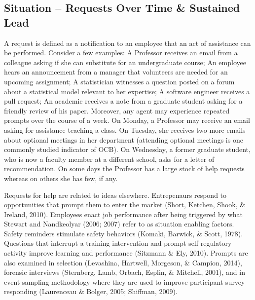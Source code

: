 \documentclass[english,,man]{apa6}
\begin{document}
\hypertarget{situation-requests-over-time-sustained-lead}{%
\subsection{Situation -- Requests Over Time \& Sustained Lead}\label{situation-requests-over-time-sustained-lead}}

A request is defined as a notification to an employee that an act of assistance can be performed. Consider a few examples: A Professor receives an email from a colleague asking if she can substitute for an undergraduate course; An employee hears an announcement from a manager that volunteers are needed for an upcoming assignment; A statistician witnesses a question posted on a forum about a statistical model relevant to her expertise; A software engineer receives a pull request; An academic receives a note from a graduate student asking for a friendly review of his paper. Moreover, any agent may experience repeated prompts over the course of a week. On Monday, a Professor may receive an email asking for assistance teaching a class. On Tuesday, she receives two more emails about optional meetings in her department (attending optional meetings is one commonly studied indicator of OCB). On Wednesday, a former graduate student, who is now a faculty member at a different school, asks for a letter of recommendation. On some days the Professor has a large stock of help requests whereas on others she has few, if any.

Requests for help are related to ideas elsewhere. Entrepenaurs respond to opportunities that prompt them to enter the market (Short, Ketchen, Shook, \& Ireland, 2010). Employees enact job performance after being triggered by what Stewart and Nandkeolyar (2006; 2007) refer to as situation enabling factors. Safety reminders stimulate safety behaviors (Komaki, Barwick, \& Scott, 1978). Questions that interrupt a training intervention and prompt self-regulatory activity improve learning and performance (Sitzmann \& Ely, 2010). Prompts are also examined in selection (Levashina, Hartwell, Morgeson, \& Campion, 2014), forensic interviews (Sternberg, Lamb, Orbach, Esplin, \& Mitchell, 2001), and in event-sampling methodology where they are used to improve participant survey responding (Laurenceau \& Bolger, 2005; Shiffman, 2009).
\end{document}
